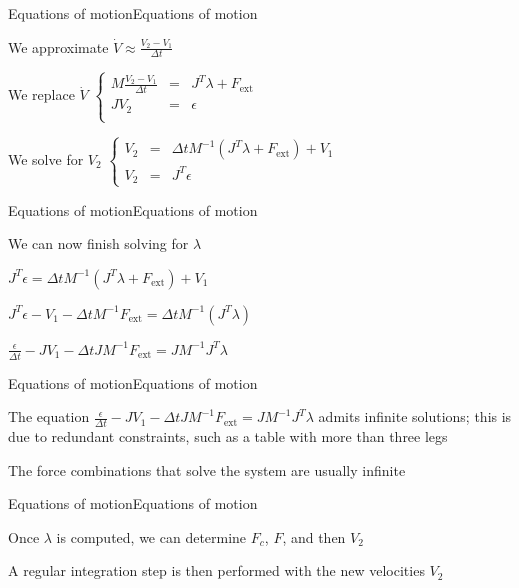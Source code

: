 \documentclass{beamer}
\begin{document}
\begin{slide}{Equations of motion}{Equations of motion}{
\item We approximate $\dot V \approx \frac{V_2 - V_1}{\Delta t}$
\item We replace $\dot V$
$\left\{\begin{matrix}
M \frac{V_2 - V_1}{\Delta t} & = & J^T \lambda + F_{\text{ext}} \\
JV_2 & = & \epsilon \\
\end{matrix} \right.$
\item We solve for $V_2$
$\left\{ \begin{matrix}
V_2 & = & \Delta t M^{-1}(J^T \lambda + F_{\text{ext}}) + V_1\\
V_2 & = & J^T \epsilon
\end{matrix} \right.$
}\end{slide}

\begin{slide}{Equations of motion}{Equations of motion}{
\item We can now finish solving for $\lambda$
\item $J^T \epsilon = \Delta t M^{-1}(J^T \lambda + F_{\text{ext}}) + V_1$
\item $J^T \epsilon - V_1 - \Delta t M^{-1}F_{\text{ext}} = \Delta t M^{-1}(J^T \lambda)$
\item $\frac{\epsilon}{\Delta t} - J V_1 - \Delta t J M^{-1}F_{\text{ext}} = J M^{-1} J^T \lambda$
}\end{slide}

\begin{slide}{Equations of motion}{Equations of motion}{
\item The equation $\frac{\epsilon}{\Delta t} - J V_1 - \Delta t J M^{-1}F_{\text{ext}} = J M^{-1} J^T \lambda$ admits infinite solutions; this is due to redundant constraints, such as a table with more than three legs
\item The force combinations that solve the system are usually infinite
}\end{slide}

\begin{slide}{Equations of motion}{Equations of motion}{
\item Once $\lambda$ is computed, we can determine $F_c$, $F$, and then $V_2$
\item A regular integration step is then performed with the new velocities $V_2$
}\end{slide}
\end{document}
